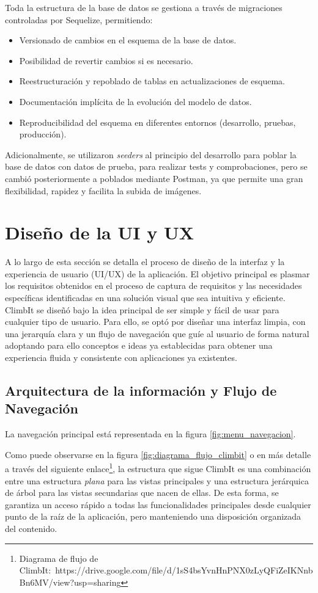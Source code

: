 Toda la estructura de la base de datos se gestiona a través de migraciones controladas por Sequelize, permitiendo:

\begin{itemize}
    \item Versionado de cambios en el esquema de la base de datos.
    \item Posibilidad de revertir cambios si es necesario.
    \item Reestructuración y repoblado de tablas en actualizaciones de esquema.
    \item Documentación implícita de la evolución del modelo de datos.
    \item Reproducibilidad del esquema en diferentes entornos (desarrollo, pruebas, producción).
\end{itemize}

Adicionalmente, se utilizaron \textit{seeders} al principio del desarrollo para poblar la base de datos con datos de prueba, para realizar tests y comprobaciones, pero se cambió posteriormente a poblados mediante Postman, ya que permite una gran flexibilidad, rapidez y facilita la subida de imágenes.

\section{Diseño de la UI y UX}

A lo largo de esta sección se detalla el proceso de diseño de la interfaz y la experiencia de usuario (UI/UX) de la aplicación. El objetivo principal es plasmar los requisitos obtenidos en el proceso de captura de requisitos y las necesidades específicas identificadas en una solución visual que sea intuitiva y eficiente. ClimbIt se diseñó bajo la idea principal de ser simple y fácil de usar para cualquier tipo de usuario. Para ello, se optó por diseñar una interfaz limpia, con una jerarquía clara y un flujo de navegación que guíe al usuario de forma natural adoptando para ello conceptos e ideas ya establecidas para obtener una experiencia fluida y consistente con aplicaciones ya existentes.

\subsection{Arquitectura de la información y Flujo de Navegación}

La navegación principal está representada en la figura \ref{fig:menu_navegacion}.

Como puede observarse en la figura \ref{fig:diagrama_flujo_climbit} o en más detalle a través del siguiente enlace\footnote{Diagrama de flujo de ClimbIt:\ https://drive.google.com/file/d/1sS4bsYvnHnPNX0zLyQFiZeIKNnbBn6MV/view?usp=sharing}, la estructura que sigue ClimbIt es una combinación entre una estructura \textit{plana} para las vistas principales y una estructura jerárquica de árbol para las vistas secundarias que nacen de ellas. De esta forma, se garantiza un acceso rápido a todas las funcionalidades principales desde cualquier punto de la raíz de la aplicación, pero manteniendo una disposición organizada del contenido.

